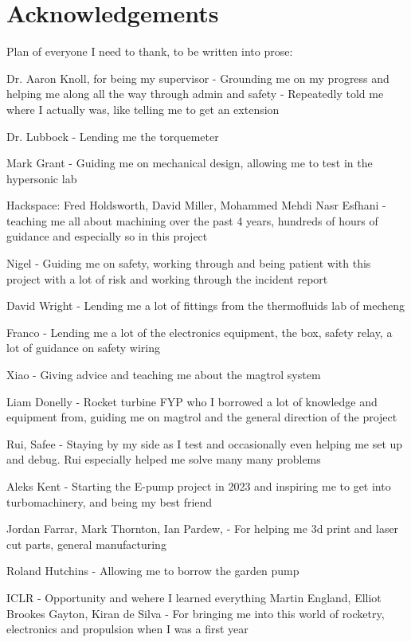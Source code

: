 \section*{Acknowledgements}

Plan of everyone I need to thank, to be written into prose:

Dr. Aaron Knoll, for being my supervisor
- Grounding me on my progress and helping me along all the way through admin and safety
- Repeatedly told me where I actually was, like telling me to get an extension

Dr. Lubbock
- Lending me the torquemeter

Mark Grant
- Guiding me on mechanical design, allowing me to test in the hypersonic lab


Hackspace:
Fred Holdsworth, David Miller, Mohammed Mehdi Nasr Esfhani
- teaching me all about machining over the past 4 years, hundreds of hours of guidance and especially so in this project

Nigel
- Guiding me on safety, working through and being patient with this project with a lot of risk and working through the incident report

David Wright
- Lending me a lot of fittings from the thermofluids lab of mecheng

Franco
- Lending me a lot of the electronics equipment, the box, safety relay, a lot of guidance on safety wiring

Xiao
- Giving advice and teaching me about the magtrol system

Liam Donelly
- Rocket turbine FYP who I borrowed a lot of knowledge and equipment from, guiding me on magtrol and the general direction of the project

Rui, Safee
- Staying by my side as I test and occasionally even helping me set up and debug. Rui especially helped me solve many many problems

Aleks Kent
- Starting the E-pump project in 2023 and inspiring me to get into turbomachinery, and being my best friend

Jordan Farrar, Mark Thornton, Ian Pardew, 
- For helping me 3d print and laser cut parts, general manufacturing

Roland Hutchins
- Allowing me to borrow the garden pump

ICLR - Opportunity and wehere I learned everything
Martin England, Elliot Brookes Gayton, Kiran de Silva
 - For bringing me into this world of rocketry, electronics and propulsion when I was a first year

